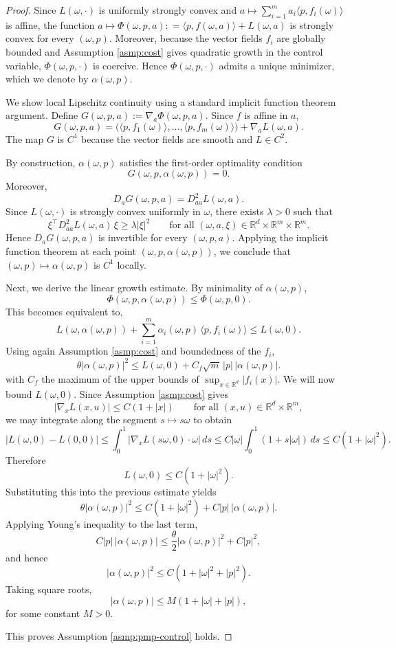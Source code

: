 \documentclass[10pt,a4paper]{amsart}
\begin{document}
\begin{proof}

Since $L(\omega,\cdot)$ is uniformly strongly convex and $
a \mapsto \sum_{i=1}^m a_i \langle p,f_i(\omega)\rangle $
is affine, the function
$
a \mapsto \Phi(\omega,p,a): =\langle p,f(\omega,a)\rangle + L(\omega,a)
$
is strongly convex for every $(\omega,p)$. Moreover, because the vector fields $f_i$ are globally bounded and Assumption \ref{asmp:cost} gives quadratic growth in the control variable, $\Phi(\omega,p,\cdot)$ is coercive. Hence $\Phi(\omega,p,\cdot)$ admits a unique minimizer, which we denote by $\alpha(\omega,p)$.

We show local Lipschitz continuity using a standard implicit function theorem argument.
Define
$G(\omega,p,a):=\nabla_a \Phi(\omega,p,a).$
Since $f$ is affine in $a$,
\[
G(\omega,p,a)
=
\bigl(\langle p,f_1(\omega)\rangle,\dots,\langle p,f_m(\omega)\rangle\bigr)
+
\nabla_a L(\omega,a).
\]
The map $G$ is $C^1$ because the vector fields are smooth and $L\in C^2$.

By construction, $\alpha(\omega,p)$ satisfies the first-order optimality condition
\[
G(\omega,p,\alpha(\omega,p))=0.
\]
Moreover,
\[
D_aG(\omega,p,a)=D^2_{aa}L(\omega,a).
\]
Since $L(\omega,\cdot)$ is strongly convex uniformly in $\omega$, there exists $\lambda>0$ such that
\[
\xi^\top D^2_{aa}L(\omega,a)\,\xi \ge \lambda |\xi|^2
\qquad
\text{for all }(\omega,a,\xi)\in\mathbb R^d\times\mathbb R^m\times\mathbb R^m.
\]
Hence $D_aG(\omega,p,a)$ is invertible for every $(\omega,p,a)$.
Applying the implicit function theorem at each point $
(\omega,p,\alpha(\omega,p))$, we conclude that $(\omega,p)\mapsto \alpha(\omega,p)$ is $C^1$ locally.

Next, we derive the linear growth estimate.
By minimality of $\alpha(\omega,p)$,
\[
\Phi(\omega,p,\alpha(\omega,p))\le \Phi(\omega,p,0).
\]
This becomes equivalent to,
\[
L(\omega,\alpha(\omega,p))
+
\sum_{i=1}^m \alpha_i(\omega,p)\,\langle p,f_i(\omega)\rangle
\le
L(\omega,0).
\]
Using again Assumption \ref{asmp:cost} and boundedness of the $f_i$,
\[
\theta |\alpha(\omega,p)|^2
\le
L(\omega,0)+ C_f\sqrt m\,|p|\,|\alpha(\omega,p)|.
\]
with $C_f$ the maximum of the upper bounds of $\sup_{x \in \mathbb{R}^d} |f_i(x)|$.
We will now bound $L(\omega,0)$. Since Assumption \ref{asmp:cost} gives
\[
|\nabla_xL(x,u)|\le C(1+|x|)
\qquad \text{for all }(x,u) \in \mathbb{R}^d \times \mathbb{R}^m,
\]
we may integrate along the segment $s\mapsto s\omega$ to obtain
\[
|L(\omega,0)-L(0,0)|
\le
\int_0^1 |\nabla_xL(s\omega,0)\cdot \omega|\,ds
\le
C|\omega|\int_0^1 (1+s|\omega|)\,ds
\le
C(1+|\omega|^2).
\]
Therefore
\[
L(\omega,0)\le C(1+|\omega|^2).
\]
Substituting this into the previous estimate yields
\[
\theta |\alpha(\omega,p)|^2
\le
C(1+|\omega|^2)+C|p|\,|\alpha(\omega,p)|.
\]
Applying Young's inequality to the last term,
\[
C|p|\,|\alpha(\omega,p)|
\le
\frac{\theta}{2}|\alpha(\omega,p)|^2 + C|p|^2,
\]
and hence
\[
|\alpha(\omega,p)|^2 \le C(1+|\omega|^2+|p|^2).
\]
Taking square roots,
\[
|\alpha(\omega,p)|\le M(1+|\omega|+|p|),
\]
for some constant $M>0$.

This proves Assumption \ref{asmp:pmp-control} holds.
\end{proof}
\end{document}
